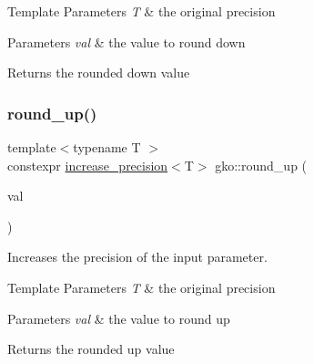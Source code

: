 \begin{DoxyTemplParams}{Template Parameters}
{\em T} & the original precision\\
\hline
\end{DoxyTemplParams}

\begin{DoxyParams}{Parameters}
{\em val} & the value to round down\\
\hline
\end{DoxyParams}
\begin{DoxyReturn}{Returns}
the rounded down value 
\end{DoxyReturn}
\mbox{\label{namespacegko_ad45d1c855f31d2f8c1d3d799f2cf21c6}} 
\subsubsection{\texorpdfstring{round\+\_\+up()}{round\_up()}}
{\footnotesize\ttfamily template$<$typename T $>$ \\
constexpr \hyperlink{namespacegko_a373c2b4782d95e675d7e91a75bab101d}{increase\+\_\+precision}$<$T$>$ gko\+::round\+\_\+up (\begin{DoxyParamCaption}\item[{T}]{val }\end{DoxyParamCaption})\hspace{0.3cm}{\ttfamily [inline]}}



Increases the precision of the input parameter. 


\begin{DoxyTemplParams}{Template Parameters}
{\em T} & the original precision\\
\hline
\end{DoxyTemplParams}

\begin{DoxyParams}{Parameters}
{\em val} & the value to round up\\
\hline
\end{DoxyParams}
\begin{DoxyReturn}{Returns}
the rounded up value 
\end{DoxyReturn}
\mbox{\label{namespacegko_abbb55709b10d707b2cbef803832aa834}} 
